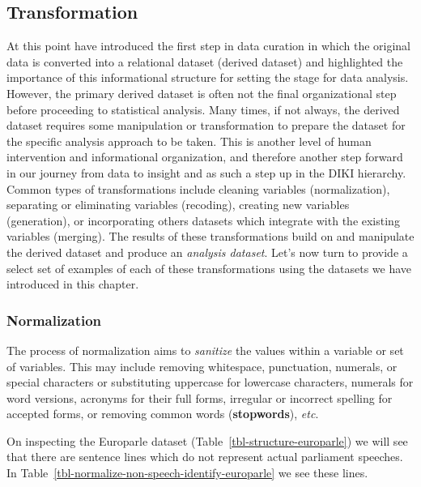 \documentclass[
  letterpaper,
]{latex/krantz}
\begin{document}
\hypertarget{transformation}{%
\subsection{Transformation}\label{transformation}}

At this point have introduced the first step in data curation in which
the original data is converted into a relational dataset (derived
dataset) and highlighted the importance of this informational structure
for setting the stage for data analysis. However, the primary derived
dataset is often not the final organizational step before proceeding to
statistical analysis. Many times, if not always, the derived dataset
requires some manipulation or transformation to prepare the dataset for
the specific analysis approach to be taken. This is another level of
human intervention and informational organization, and therefore another
step forward in our journey from data to insight and as such a step up
in the DIKI hierarchy. Common types of transformations include cleaning
variables (normalization), separating or eliminating variables
(recoding), creating new variables (generation), or incorporating others
datasets which integrate with the existing variables (merging). The
results of these transformations build on and manipulate the derived
dataset and produce an \emph{analysis dataset}. Let's now turn to
provide a select set of examples of each of these transformations using
the datasets we have introduced in this chapter.

\hypertarget{normalization}{%
\subsubsection{Normalization}\label{normalization}}

The process of normalization aims to \emph{sanitize} the values within a
variable or set of variables. This may include removing whitespace,
punctuation, numerals, or special characters or substituting uppercase
for lowercase characters, numerals for word versions, acronyms for their
full forms, irregular or incorrect spelling for accepted forms, or
removing common words (\textbf{stopwords}), \emph{etc}.

On inspecting the Europarle dataset
(Table~\ref{tbl-structure-europarle}) we will see that there are
sentence lines which do not represent actual parliament speeches. In
Table~\ref{tbl-normalize-non-speech-identify-europarle} we see these
lines.
\end{document}

